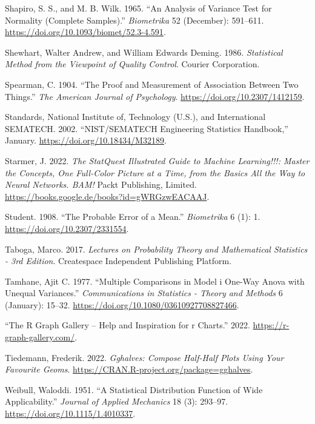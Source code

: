 \documentclass[
  a4paper,
]{scrbook}
\newlength{\cslhangindent}
\newenvironment{CSLReferences}[2] %
 {\begin{list}{}{%
  \setlength{\itemindent}{0pt}
  \setlength{\leftmargin}{0pt}
  \setlength{\parsep}{0pt}
  \ifodd #1
   \setlength{\leftmargin}{\cslhangindent}
   \setlength{\itemindent}{-1\cslhangindent}
  \fi
  \setlength{\itemsep}{#2\baselineskip}}}
 {\end{list}}
\begin{document}
\begin{CSLReferences}{1}{0}
Shapiro, S. S., and M. B. Wilk. 1965. {``An Analysis of Variance Test
for Normality (Complete Samples).''} \emph{Biometrika} 52 (December):
591--611. \url{https://doi.org/10.1093/biomet/52.3-4.591}.

Shewhart, Walter Andrew, and William Edwards Deming. 1986.
\emph{Statistical Method from the Viewpoint of Quality Control}. Courier
Corporation.

Spearman, C. 1904. {``The Proof and Measurement of Association Between
Two Things.''} \emph{The American Journal of Psychology}.
\url{https://doi.org/10.2307/1412159}.

Standards, National Institute of, Technology (U.S.), and International
SEMATECH. 2002. {``NIST/SEMATECH Engineering Statistics Handbook,''}
January. \url{https://doi.org/10.18434/M32189}.

Starmer, J. 2022. \emph{The StatQuest Illustrated Guide to Machine
Learning!!!: Master the Concepts, One Full-Color Picture at a Time, from
the Basics All the Way to Neural Networks. BAM!} Packt Publishing,
Limited. \url{https://books.google.de/books?id=gWRGzwEACAAJ}.

Student. 1908. {``The Probable Error of a Mean.''} \emph{Biometrika} 6
(1): 1. \url{https://doi.org/10.2307/2331554}.

Taboga, Marco. 2017. \emph{Lectures on Probability Theory and
Mathematical Statistics - 3rd Edition}. Createspace Independent
Publishing Platform.

Tamhane, Ajit C. 1977. {``Multiple Comparisons in Model i One-Way Anova
with Unequal Variances.''} \emph{Communications in Statistics - Theory
and Methods} 6 (January): 15--32.
\url{https://doi.org/10.1080/03610927708827466}.

{``The {R} Graph Gallery -- Help and Inspiration for r Charts.''} 2022.
\url{https://r-graph-gallery.com/}.

Tiedemann, Frederik. 2022. \emph{Gghalves: Compose Half-Half Plots Using
Your Favourite Geoms}.
\url{https://CRAN.R-project.org/package=gghalves}.

Weibull, Waloddi. 1951. {``A Statistical Distribution Function of Wide
Applicability.''} \emph{Journal of Applied Mechanics} 18 (3): 293--97.
\url{https://doi.org/10.1115/1.4010337}.


\end{CSLReferences}
\end{document}
